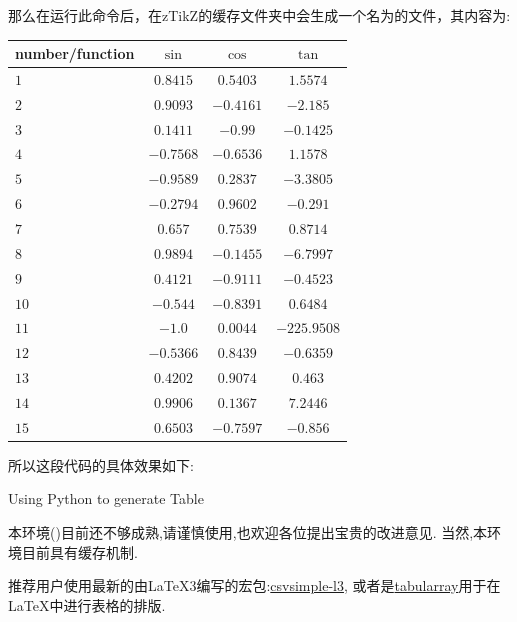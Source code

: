 那么在运行此命令后，在zTikZ的缓存文件夹中会生成一个名为的文件，其内容为:
\begin{codeprint}
\begin{tabular}{p{3cm}ccc}
\hline
number/function & $\sin$ & $\cos$ & $\tan$\\
\hline
$1$ & $0.8415$ &  $0.5403$ & $1.5574$\\
$2$ & $0.9093$ &  $-0.4161$ & $-2.185$\\
$3$ & $0.1411$ &  $-0.99$ & $-0.1425$\\
$4$ & $-0.7568$ &  $-0.6536$ & $1.1578$\\
$5$ & $-0.9589$ &  $0.2837$ & $-3.3805$\\
$6$ & $-0.2794$ &  $0.9602$ & $-0.291$\\
$7$ & $0.657$ &  $0.7539$ & $0.8714$\\
$8$ & $0.9894$ &  $-0.1455$ & $-6.7997$\\
$9$ & $0.4121$ &  $-0.9111$ & $-0.4523$\\
$10$ & $-0.544$ &  $-0.8391$ & $0.6484$\\
$11$ & $-1.0$ &  $0.0044$ & $-225.9508$\\
$12$ & $-0.5366$ &  $0.8439$ & $-0.6359$\\
$13$ & $0.4202$ &  $0.9074$ & $0.463$\\
$14$ & $0.9906$ &  $0.1367$ & $7.2446$\\
$15$ & $0.6503$ &  $-0.7597$ & $-0.856$\\
\hline
\end{tabular}
\end{codeprint}

所以这段代码的具体效果如下:
\begin{table}[H]
    \centering
    
    \caption{Using Python to generate Table}
\end{table}

\begin{remark}
    本环境()目前还不够成熟,请谨慎使用,也欢迎各位提出宝贵的改进意见. 
    当然,本环境目前具有缓存机制.
\end{remark}

\begin{remark}
    推荐用户使用最新的由\LaTeX3编写的宏包:\href{https://mirror-hk.koddos.net/CTAN/macros/latex/contrib/csvsimple/csvsimple-l3.pdf}{csvsimple-l3},
    或者是\href{https://mirror-hk.koddos.net/CTAN/macros/latex/contrib/tabularray/tabularray.pdf}{tabularray}用于在\LaTeX{}中进行表格的排版.
\end{remark}

